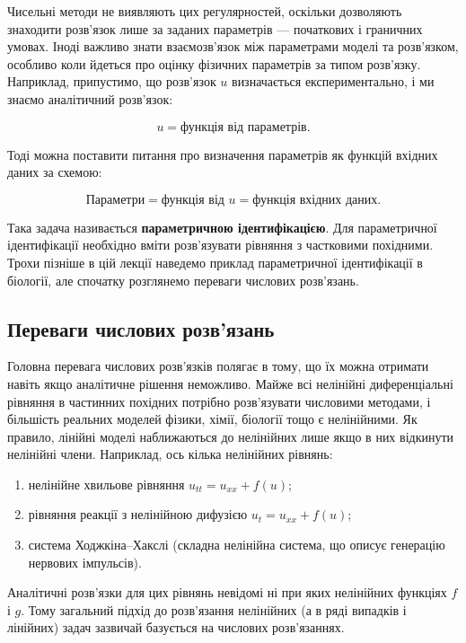\documentclass[
  ukrainian,
]{article}
\providecommand{\tightlist}{%
  \setlength{\itemsep}{0pt}\setlength{\parskip}{0pt}}
\begin{document}
Чисельні методи не виявляють цих регулярностей, оскільки дозволяють
знаходити розв'язок лише за заданих параметрів --- початкових і
граничних умовах. Іноді важливо знати взаємозв'язок між параметрами
моделі та розв'язком, особливо коли йдеться про оцінку фізичних
параметрів за типом розв'язку. Наприклад, припустимо, що розв'язок \(u\)
визначається експериментально, і ми знаємо аналітичний розв'язок:

\[
u = \text{функція від параметрів}.
\]

Тоді можна поставити питання про визначення параметрів як функцій
вхідних даних за схемою:

\[
\text{Параметри} = \text{функція від } u = \text{функція вхідних даних}.
\]

Така задача називається \textbf{параметричною ідентифікацією}. Для
параметричної ідентифікації необхідно вміти розв'язувати рівняння з
частковими похідними. Трохи пізніше в цій лекції наведемо приклад
параметричної ідентифікації в біології, але спочатку розглянемо переваги
числових розв'язань.

\subsection{Переваги числових
розв'язань}\label{ux43fux435ux440ux435ux432ux430ux433ux438-ux447ux438ux441ux43bux43eux432ux438ux445-ux440ux43eux437ux432ux44fux437ux430ux43dux44c}

Головна перевага числових розв'язків полягає в тому, що їх можна
отримати навіть якщо аналітичне рішення неможливо. Майже всі нелінійні
диференціальні рівняння в частинних похідних потрібно розв'язувати
числовими методами, і більшість реальних моделей фізики, хімії, біології
тощо є нелінійними. Як правило, лінійні моделі наближаються до
нелінійних лише якщо в них відкинути нелінійні члени. Наприклад, ось
кілька нелінійних рівнянь:

\begin{enumerate}
\def\labelenumi{\arabic{enumi}.}
\tightlist
\item
  нелінійне хвильове рівняння \(u_{tt} = u_{xx} + f(u)\);
\item
  рівняння реакції з нелінійною дифузією \(u_t = u_{xx} + f(u)\);
\item
  система Ходжкіна--Хакслі (складна нелінійна система, що описує
  генерацію нервових імпульсів).
\end{enumerate}

Аналітичні розв'язки для цих рівнянь невідомі ні при яких нелінійних
функціях \(f\) і \(g\). Тому загальний підхід до розв'язання нелінійних
(а в ряді випадків і лінійних) задач зазвичай базується на числових
розв'язаннях.
\end{document}

